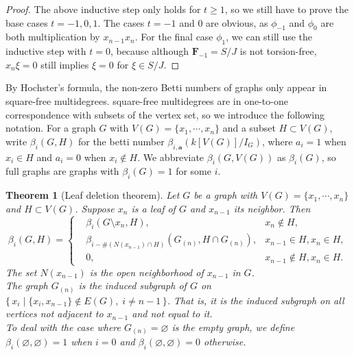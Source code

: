 \documentclass[dvipsnames,10pt]{article}
\newtheorem{theorem}{Theorem}[section]
\begin{document}
\begin{proof}
    The above inductive step only holds for $t\geqslant 1$, so we still have to prove the base cases $t=-1,0,1$. The cases $t=-1$ and $0$ are obvious, as $\phi_{-1}$ and $\phi_0$ are both multiplication by $x_{n-1}x_n$. For the final case $\phi_1$, we can still use the inductive step with $t=0$, because although $\mathbf{F}_{-1}=S/J$ is not torsion-free, $x_n\xi=0$ still implies $\xi=0$ for $\xi\in S/J$.
\end{proof}

By Hochster's formula, the non-zero Betti numbers of graphs only appear in square-free multidegrees. square-free multidegrees are in one-to-one correspondence with subsets of the vertex set, so we introduce the following notation. For a graph $G$ with $V(G)=\{x_1,\cdots,x_n\}$ and a subset $H\subset V(G)$, write $\beta_i(G,H)$ for the betti number $\beta_{i,\mathbf{a}}(k[V(G)]/I_G)$, where $a_i=1$ when $x_i\in H$ and $a_i=0$ when $x_i\notin H$. We abbreviate $\beta_i(G,V(G))$ as $\beta_i(G)$, so full graphs are graphs with $\beta_i(G)=1$ for some $i$.

\begin{theorem}[Leaf deletion theorem]
    Let $G$ be a graph with $V(G)=\{x_1,\cdots,x_n\}$ and $H\subset V(G)$. Suppose $x_n$ is a leaf of $G$ and $x_{n-1}$ its neighbor. Then
    \begin{equation*}
        \beta_i(G,H) = \left\{
            \begin{aligned}
                &\beta_i(G\setminus x_n,H), &x_n\notin H,\\
                &\beta_{i-\#(N(x_{n-1})\cap H)}(G_{(n)},H\cap G_{(n)}), &x_{n-1}\in H,x_n\in H,\\
                &0, &x_{n-1}\notin H,x_n\in H.
            \end{aligned}
        \right.
    \end{equation*}
    The set $N(x_{n-1})$ is the open neighborhood of $x_{n-1}$ in $G$.\\
    The graph $G_{(n)}$ is the induced subgraph of $G$ on $\{\,x_i\mid \{x_i,x_{n-1}\}\notin E(G),\;i\neq n-1\,\}$. That is, it is the induced subgraph on all vertices not adjacent to $x_{n-1}$ and not equal to it.\\
    To deal with the case where $G_{(n)}=\varnothing$ is the empty graph, we define $\beta_i(\varnothing,\varnothing)=1$ when $i=0$ and $\beta_i(\varnothing,\varnothing)=0$ otherwise.
\end{theorem}
\end{document}
